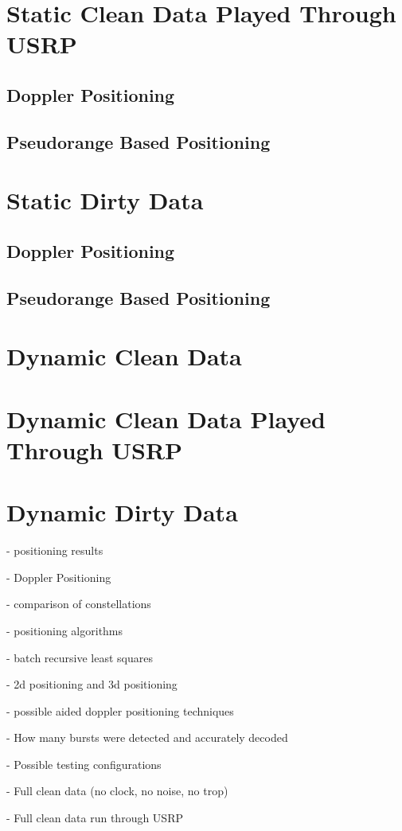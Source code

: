 \documentclass[12pt]{report}
\begin{document}
\section{Static Clean Data Played Through USRP}
\subsection{Doppler Positioning}
\subsection{Pseudorange Based Positioning}
\section{Static Dirty Data}
\subsection{Doppler Positioning}
\subsection{Pseudorange Based Positioning}
\section{Dynamic Clean Data}
\section{Dynamic Clean Data Played Through USRP}
\section{Dynamic Dirty Data}
    - positioning results

    - Doppler Positioning 

    - comparison of constellations 

    - positioning algorithms

    - batch recursive least squares

    - 2d positioning and 3d positioning

    - possible aided doppler positioning techniques

    - How many bursts were detected and accurately decoded

    - Possible testing configurations   
        
        - Full clean data (no clock, no noise, no trop)

        - Full clean data run through USRP 
\end{document}

